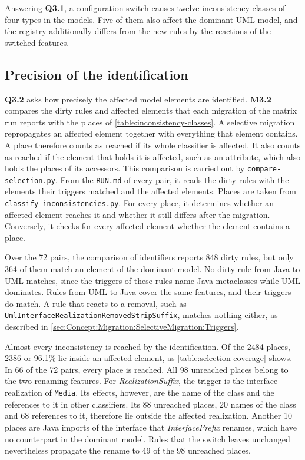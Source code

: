 Answering \textbf{Q3.1}, a configuration switch causes twelve inconsistency classes of four types in the models.
Five of them also affect the dominant UML model, and the registry additionally differs from the new rules by the reactions of the switched features.

\subsection{Precision of the identification}
\label{sec:Evaluation:InconsistencyIdentification:PrecisionOfTheIdentification}

\textbf{Q3.2} asks how precisely the affected model elements are identified.
\textbf{M3.2} compares the dirty rules and affected elements that each migration of the matrix run reports with the places of \autoref{table:inconsistency-classes}.
A selective migration repropagates an affected element together with everything that element contains.
A place therefore counts as reached if its whole classifier is affected.
It also counts as reached if the element that holds it is affected, such as an attribute, which also holds the places of its accessors.
This comparison is carried out by \texttt{compare-selection.py}.
From the \texttt{RUN.md} of every pair, it reads the dirty rules with the elements their triggers matched and the affected elements.
Places are taken from \texttt{classify-inconsistencies.py}.
For every place, it determines whether an affected element reaches it and whether it still differs after the migration.
Conversely, it checks for every affected element whether the element contains a place.

Over the 72 pairs, the comparison of identifiers reports 848 dirty rules, but only 364 of them match an element of the dominant model.
No dirty rule from Java to UML matches, since the triggers of these rules name Java metaclasses while UML dominates.
Rules from UML to Java cover the same features, and their triggers do match.
A rule that reacts to a removal, such as \texttt{UmlInterfaceRealizationRemovedStripSuffix}, matches nothing either, as described in \autoref{sec:Concept:Migration:SelectiveMigration:Triggers}.

Almost every inconsistency is reached by the identification.
Of the 2484 places, 2386 or 96.1\% lie inside an affected element, as \autoref{table:selection-coverage} shows.
In 66 of the 72 pairs, every place is reached.
All 98 unreached places belong to the two renaming features.
For \textit{RealizationSuffix}, the trigger is the interface realization of \texttt{Media}.
Its effects, however, are the name of the class and the references to it in other classifiers.
Its 88 unreached places, 20 names of the class and 68 references to it, therefore lie outside the affected realization.
Another 10 places are Java imports of the interface that \textit{InterfacePrefix} renames, which have no counterpart in the dominant model.
Rules that the switch leaves unchanged nevertheless propagate the rename to 49 of the 98 unreached places.

